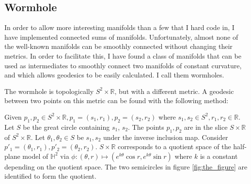 \subsection{Wormhole}
\label{Wormhole}


In order to allow more interesting manifolds than a few that I hard code in, I have implemented connected sums of manifolds. Unfortunately, almost none of the well-known manifolds can be smoothly connected without changing their metrics. In order to facilitate this, I have found a class of manifolds that can be used as intermediates to smoothly connect two manifolds of constant curvature, and which allows geodesics to be easily calculated. I call them wormholes.

The wormhole is topologically $S^2 \times \mathbb{R}$, but with a different metric. A geodesic between two points on this metric can be found with the following method:

Given $p_1, p_2 \in S^2 \times \mathbb{R}, p_1 = (s_1,r_1),p_2 = (s_2,r_2)$ where $s_1,s_2 \in S^2, r_1,r_2 \in \mathbb{R}$.
Let $S$ be the great circle containing $s_1$, $s_2$.
The points $p_1, p_2$ are in the slice $S \times \mathbb{R}$ of $S^2 \times \mathbb{R}$.
Let $\theta_1, \theta_2 \in S$ be $s_1, s_2$ under the inverse inclusion map.
Consider $p'_1 = (\theta_1,r_1), p'_2 = (\theta_2,r_2)$.
$S \times \mathbb{R}$ corresponds to a quotient space of the half-plane model of $\mathbb{H}^2$ via $\phi:(\theta,r) \mapsto (e^{k\theta} \cos r, e^{k\theta} \sin r)$ where $k$ is a constant depending on the quotient space.
The two semicircles in figure \ref{fig:the_figure} are identified to form the quotient.

